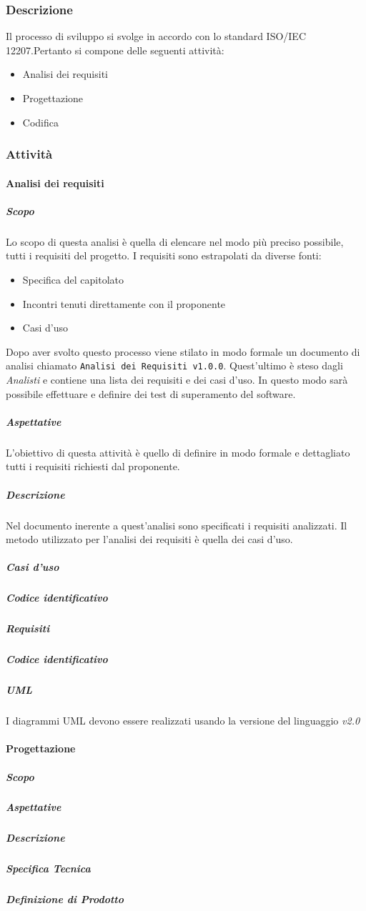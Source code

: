 	\subsubsection{Descrizione}
	Il processo di sviluppo si svolge in accordo con lo standard ISO/IEC 12207.Pertanto si compone delle seguenti attività:
	\begin{itemize}
		\item Analisi dei requisiti
		\item Progettazione
		\item Codifica
	\end{itemize}
	
	\subsubsection{Attività}
		\paragraph{Analisi dei requisiti}
			\subparagraph{Scopo}
			Lo scopo di questa analisi è quella di elencare nel modo più preciso possibile, tutti i requisiti del progetto. 
			I requisiti sono estrapolati da diverse fonti:
				\begin{itemize}
				\item Specifica del capitolato 
				\item Incontri tenuti direttamente con il proponente
				\item Casi d'uso
			\end{itemize}
		    Dopo aver svolto questo processo viene stilato in modo formale un documento di analisi chiamato \texttt{Analisi dei Requisiti v1.0.0}.
		    Quest'ultimo è steso dagli \emph{Analisti} e contiene una lista dei requisiti e dei casi d'uso.
		    In questo modo sarà possibile effettuare e definire dei test di superamento del software. 
			\subparagraph{Aspettative}
			L'obiettivo di questa attività è quello di definire in modo formale e dettagliato tutti i requisiti richiesti dal proponente.
			\subparagraph{Descrizione}
			Nel documento inerente a quest'analisi sono specificati i requisiti analizzati.
			Il metodo utilizzato per l'analisi dei requisiti è quella dei casi d'uso.
			\subparagraph{Casi d'uso}
			\subparagraph{Codice identificativo}
			\subparagraph{Requisiti}
			\subparagraph{Codice identificativo}
			\subparagraph{UML}
			I diagrammi UML devono essere realizzati usando la versione del linguaggio \textit{v2.0}
		\paragraph{Progettazione}
			\subparagraph{Scopo}
			\subparagraph{Aspettative}
			\subparagraph{Descrizione}
			\subparagraph{Specifica Tecnica}
			\subparagraph{Definizione di Prodotto}
